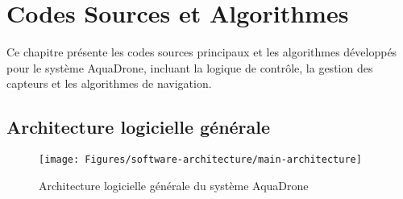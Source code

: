 \chapter{Codes Sources et Algorithmes}
\label{app:software-code}

Ce chapitre présente les codes sources principaux et les algorithmes développés pour le système AquaDrone, incluant la logique de contrôle, la gestion des capteurs et les algorithmes de navigation.

\section{Architecture logicielle générale}
\begin{figure}[!htbp]
    \centering
    \texttt{[image: Figures/software-architecture/main-architecture]}
    \caption{Architecture logicielle générale du système AquaDrone}
    \label{fig:software-architecture}
\end{figure}


